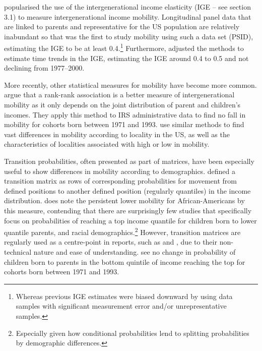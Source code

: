 \documentclass[notitlepage,12pt]{article}
\begin{document}
\cite{solon1992intergenerational} popularised the use of the intergenerational income elasticity (IGE -- see section 3.1) to measure intergenerational income mobility.  Longitudinal panel data that are linked to parents and representative for the US population are relatively inabundant so that \cite{solon1992intergenerational} was the first to study mobility using such a data set (PSID), estimating the IGE to be at least 0.4.\footnote{Whereas previous IGE estimates were biased downward by using data samples with significant measurement error and/or unrepresentative samples.}  Furthermore, \cite{lee2009trends} adjusted the methods to estimate time trends in the IGE, estimating the IGE around 0.4 to 0.5 and not declining from 1977--2000.

More recently, other statistical measures for mobility have become more common.  \cite{chetty2014united} argue that a rank-rank association is a better measure of intergenerational mobility as it only depends on the joint distribution of parent and children's incomes.  They apply this method to IRS administrative data to find no fall in mobility for cohorts born between 1971 and 1993.  \cite{chetty2014land} use similar methods to find vast differences in mobility according to locality in the US, as well as the characteristics of localities associated with high or low in mobility.

Transition probabilities, often presented as part of matrices, have been especially useful to show differences in mobility according to demographics.  
\cite{shorrocks1978measurement} defined a transition matrix as rows of corresponding probabilities for movement from defined positions to another defined position (regularly quantiles) in the income distribution.  \cite{Mazumder2014} does note the persistent lower mobility for African-Americans by this measure, contending that there are surprisingly few studies that specifically focus on probabilities of reaching a top income quantile for children born to lower quantile parents, and racial demographics.\footnote{Especially given how conditional probabilities lend to splitting probabilities by demographic differences.}  However, transition matrices are regularly used as a centre-point in reports, such as \cite{blanden2005intergenerational} and \cite{sawhill2008trends}, due to their non-technical nature and ease of understanding.  \cite{chetty2014united} see no change in probability of children born to parents in the bottom quintile of income reaching the top for cohorts born between 1971 and 1993.
\end{document}
